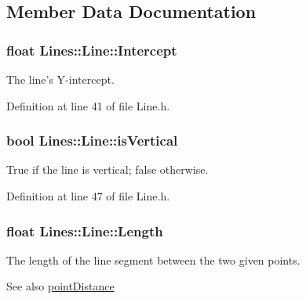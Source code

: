 \subsection{Member Data Documentation}
\hypertarget{classLines_1_1Line_a61365108d69be8b700fa912b09c5ad41}{
\subsubsection[{Intercept}]{\setlength{\rightskip}{0pt plus 5cm}float {\bf Lines::Line::Intercept}}}
\label{classLines_1_1Line_a61365108d69be8b700fa912b09c5ad41}


The line's Y-\/intercept. 



Definition at line 41 of file Line.h.

\hypertarget{classLines_1_1Line_aa150ea0e90c00de939de94d579fd97c0}{
\subsubsection[{isVertical}]{\setlength{\rightskip}{0pt plus 5cm}bool {\bf Lines::Line::isVertical}}}
\label{classLines_1_1Line_aa150ea0e90c00de939de94d579fd97c0}


True if the line is vertical; false otherwise. 



Definition at line 47 of file Line.h.

\hypertarget{classLines_1_1Line_a8f9ad3f6b37acb856d3f7781d163ab48}{
\subsubsection[{Length}]{\setlength{\rightskip}{0pt plus 5cm}float {\bf Lines::Line::Length}}}
\label{classLines_1_1Line_a8f9ad3f6b37acb856d3f7781d163ab48}


The length of the line segment between the two given points. 

\begin{DoxySeeAlso}{See also}
\hyperlink{HelperFunctions_8h_a713752c5b3408bf1eb3332172ef93db0}{pointDistance} 
\end{DoxySeeAlso}


